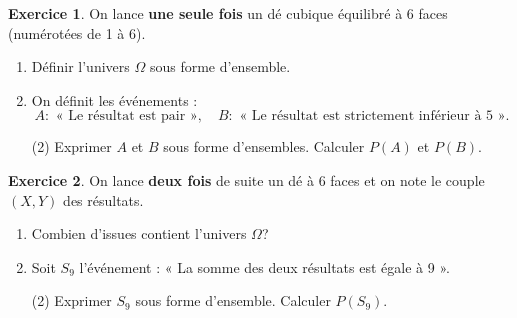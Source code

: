 \documentclass{exam}
\theoremstyle{definition}
\newtheorem{exercice}{Exercice}
\begin{document}

\vspace{2mm}
\noindent
{}

\begin{exercice}

On lance \textbf{une seule fois} un dé cubique équilibré à 6 faces (numérotées de 1 à 6).

\begin{enumerate}
  \item Définir l'univers \(\Omega\) sous forme d'ensemble.
  \item On définit les événements :
  \[
    A : \text{ « Le résultat est pair »},\quad
    B : \text{ « Le résultat est strictement inférieur à 5 »}.
  \]
    \begin{tasks}(2)
      \task Exprimer \(A\) et \(B\) sous forme d'ensembles.
      \task Calculer \(P(A)\) et \(P(B)\).
    \end{tasks}
\end{enumerate}

\begin{center}
\end{center}
\end{exercice}

\begin{exercice}

On lance \textbf{deux fois} de suite un dé à 6 faces et on note le couple \((X,Y)\) des résultats.

\begin{enumerate}
  \item Combien d'issues contient l'univers \(\Omega\)?
  \item Soit \(S_9\) l'événement : « La somme des deux résultats est égale à 9 ».
  \begin{tasks}(2)
    \task Exprimer \(S_9\) sous forme d'ensemble.
    \task Calculer \(P(S_9)\).
  \end{tasks}
\end{enumerate}

\begin{center}
\end{center}
\end{exercice}
\end{document}
